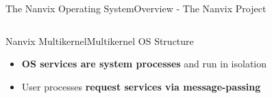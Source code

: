 \begin{frame}[fragile]{The Nanvix Operating System}{Overview - The Nanvix Project}
\begin{columns}[totalwidth=\linewidth]
\begin{columns}[totalwidth=\linewidth]
			\end{columns}


			\begin{center}
			\end{center}

		\end{columns}

		\end{frame}

		\begin{frame}[fragile]{Nanvix Multikernel}{Multikernel OS Structure}

			\begin{itemize}
				\item \textbf{OS services are system processes} and run in isolation
			\end{itemize}
			\begin{itemize}
				\item User processes \textbf{request services via message-passing}
			\end{itemize}


		\end{frame}


